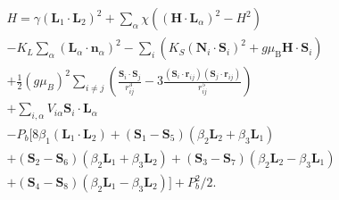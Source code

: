 \begin{multline}
    \label{eq:GdMn2O5_model}
    H=\gamma(\bm{L}_1\cdot \bm{L}_2)^2 +\sum_{\alpha}\chi((\bm{H}\cdot \bm{L}_\alpha)^2-H^2)\\
    -K_L\sum_\alpha(\bm{L}_\alpha\cdot \bm{n}_\alpha)^2 -\sum_i\left( K_S(\bm{N}_i\cdot \bm S_i)^2+ g\mu_\mathrm{B} \bm{H} \cdot \bm{S}_i\right) \\
    + \frac{1}{2}(g \mu_B)^2\sum_{i\neq j}\left(\frac{\bm S_i\cdot \bm S_j}{r_{ij}^3}-3\frac{(\bm S_i\cdot \bm{r}_{ij})(\bm S_j\cdot \bm{r}_{ij})}{r_{ij}^5}\right)
     \\+ \sum_{i,\alpha}V_{i\alpha}\bm{S}_i\cdot \bm{L}_\alpha \\
    -P_b[8 \beta_1 (\bm{L}_1\cdot \bm{L}_2)+(\bm{S}_1-\bm{S}_5)(\beta_2 \bm{L}_2 + \beta_3 \bm{L}_1) \\+ (\bm{S}_2-\bm{S}_6)(\beta_2 \bm{L}_1 + \beta_3 \bm{L}_2)
    + (\bm{S}_3-\bm{S}_7)(\beta_2 \bm{L}_2 - \beta_3 \bm{L}_1) \\
    +(\bm{S}_4-\bm{S}_8)(\beta_2 \bm{L}_1 - \beta_3 \bm{L}_2)]
    + P_b^2/2.
\end{multline}

